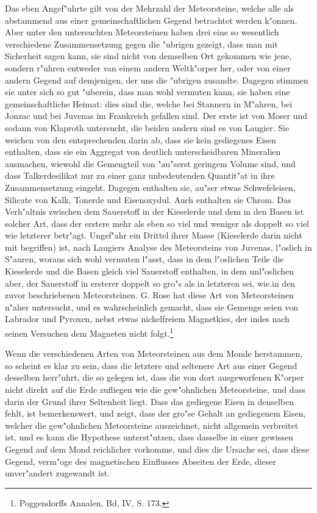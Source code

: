 \documentclass[a4paper, 11pt, oneside]{article}
\begin{document}
Das eben Angef"uhrte gilt von der Mehrzahl der Meteorsteine, welche alle als abstammend aus einer gemeinschaftlichen Gegend betrachtet werden k"onnen. Aber unter den untersuchten Meteorsteinen haben drei eine so wesentlich verschiedene Zusammensetzung gegen die "ubrigen gezeigt, dass man mit Sicherheit sagen kann, sie sind nicht von demselben Ort gekommen wie jene, sondern r"uhren entweder van einem andern Weltk"orper her, oder von einer andern Gegend auf demjenigen, der uns die "ubrigen zusandte. Dagegen stimmen sie unter sich so gut "uberein, dass man wohl vermuten kann, sie haben eine gemeinschaftliche Heimat: dies sind die, welche bei Stannern in M"ahren, bei Jonzac und bei Juvenas im Frankreich gefallen sind. Der erste ist von Moser und sodann von Klaproth untersucht, die beiden andern sind es von Laugier. Sie weichen von den entsprechenden darin ab, dass sie kein gediegenes Eisen enthalten, dass sie ein Aggregat von deutlich unterscheidbaren Mineralien ausmachen, wiewohl die Gemengteil von "au"serst geringem Volume sind, und dass Talkerdesilikat nur zu einer ganz unbedeutenden Quantit"at in ihre Zusammensetzung eingeht. Dagegen enthalten sie, au"ser etwas Schwefeleisen, Silicate von Kalk, Tonerde und Eisenoxydul. Auch enthalten sie Chrom. Das Verh"altnis zwischen dem Sauerstoff in der Kieselerde und dem in den Basen ist solcher Art, dass der erstere mehr als eben so viel und weniger als doppelt so viel wie letzterer betr"agt. Ungef"ahr ein Drittel ihrer Masse (Kieselerde darin nicht mit begriffen) ist, nach Laugiers Analyse des Meteorsteins von Juvenas, l"oslich in S"auren, woraus sich wohl vermuten l"asst, dass in dem l"oslichen Teile die Kieselerde und die Basen gleich viel Sauerstoff enthalten, in dem unl"oslichen aber, der Sauerstoff in ersterer doppelt so gro"s als in letzteren sei, wie.in den zuvor beschriebenen Meteorsteinen. G. Rose hat diese Art von Meteorsteinen n"aher untersucht, und es wahrscheinlich gemacht, dass sie Gemenge seien von Labrador und Pyroxen, nebst etwas nickelfreiem Magnetkies, der indes nach seinen Versuchen dem Magneten nicht folgt.\footnote{Poggendorffs Annalen, Bd, IV, S. 173.}

Wenn die verschiedenen Arten von Meteorsteinen aus dem Monde herstammen, so scheint es klar zu sein, dass die letztere und seltenere Art aus einer Gegend desselben herr"uhrt, die so gelegen ist, dass die von dort ausgeworfenen K"orper nicht direkt auf die Erde zufliegen wie die gew"ohnlichen Meteorsteine, und dass darin der Grund ihrer Seltenheit liegt. Dass das gediegene Eisen in denselben fehlt, ist bemerkenswert, und zeigt, dass der gro"se Gehalt an gediegenem Eisen, welcher die gew"ohnlichen Meteorsteine auszeichnet, nicht allgemein verbreitet ist, und es kann die Hypothese unterst"utzen, dass dasselbe in einer gewissen Gegend auf dem Mond reichlicher vorkomme, und dies die Ursache sei, dass diese Gegend, verm"oge des magnetischen Einflusses Abseiten der Erde, dieser unver"andert zugewandt ist.
\end{document}
